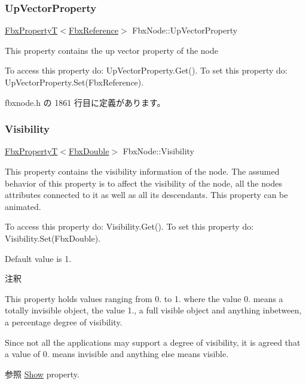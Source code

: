 \mbox{\label{class_fbx_node_a657f66c69f9ac6811487c95f01d0c345}} 
\subsubsection{\texorpdfstring{Up\+Vector\+Property}{UpVectorProperty}}
{\footnotesize\ttfamily \hyperlink{class_fbx_property_t}{Fbx\+PropertyT}$<$\hyperlink{fbxtypes_8h_a44df6a2eec915cf27cd481e5c5e48a24}{Fbx\+Reference}$>$ Fbx\+Node\+::\+Up\+Vector\+Property}

This property contains the up vector property of the node

To access this property do\+: Up\+Vector\+Property.\+Get(). To set this property do\+: Up\+Vector\+Property.\+Set(\+Fbx\+Reference). 

 fbxnode.\+h の 1861 行目に定義があります。

\mbox{\label{class_fbx_node_a9f02f0a70b81c1a656137def3e34edb7}} 
\subsubsection{\texorpdfstring{Visibility}{Visibility}}
{\footnotesize\ttfamily \hyperlink{class_fbx_property_t}{Fbx\+PropertyT}$<$\hyperlink{fbxtypes_8h_a171e72a1c46fc15c1a6c9c31948c1c5b}{Fbx\+Double}$>$ Fbx\+Node\+::\+Visibility}

This property contains the visibility information of the node. The assumed behavior of this property is to affect the visibility of the node, all the nodes attributes connected to it as well as all its descendants. This property can be animated.

To access this property do\+: Visibility.\+Get(). To set this property do\+: Visibility.\+Set(\+Fbx\+Double).

Default value is 1. \begin{DoxyRemark}{注釈}
\begin{DoxyItemize}
\item This property holds values ranging from 0. to 1. where the value 0. means a totally invisible object, the value 1., a full visible object and anything inbetween, a percentage degree of visibility.~\newline
 \item Since not all the applications may support a degree of visibility, it is agreed that a value of 0. means invisible and anything else means visible.\end{DoxyItemize}

\end{DoxyRemark}
\begin{DoxySeeAlso}{参照}
\hyperlink{class_fbx_node_a685ccf0b6e1bc5070c28d9e7a8823c74}{Show} property. 
\end{DoxySeeAlso}


